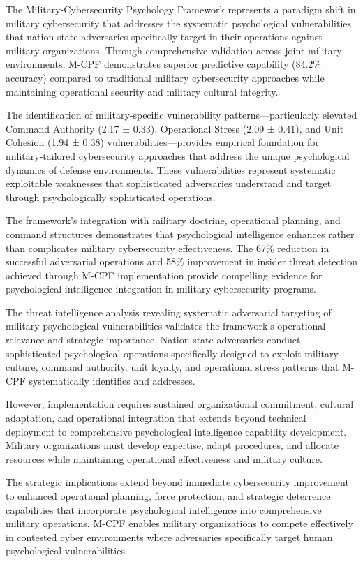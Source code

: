 \documentclass[10pt, twocolumn]{article}
\begin{document}
The Military-Cybersecurity Psychology Framework represents a paradigm shift in military cybersecurity that addresses the systematic psychological vulnerabilities that nation-state adversaries specifically target in their operations against military organizations. Through comprehensive validation across joint military environments, M-CPF demonstrates superior predictive capability (84.2\% accuracy) compared to traditional military cybersecurity approaches while maintaining operational security and military cultural integrity.

The identification of military-specific vulnerability patterns—particularly elevated Command Authority (2.17 ± 0.33), Operational Stress (2.09 ± 0.41), and Unit Cohesion (1.94 ± 0.38) vulnerabilities—provides empirical foundation for military-tailored cybersecurity approaches that address the unique psychological dynamics of defense environments. These vulnerabilities represent systematic exploitable weaknesses that sophisticated adversaries understand and target through psychologically sophisticated operations.

The framework's integration with military doctrine, operational planning, and command structures demonstrates that psychological intelligence enhances rather than complicates military cybersecurity effectiveness. The 67\% reduction in successful adversarial operations and 58\% improvement in insider threat detection achieved through M-CPF implementation provide compelling evidence for psychological intelligence integration in military cybersecurity programs.

The threat intelligence analysis revealing systematic adversarial targeting of military psychological vulnerabilities validates the framework's operational relevance and strategic importance. Nation-state adversaries conduct sophisticated psychological operations specifically designed to exploit military culture, command authority, unit loyalty, and operational stress patterns that M-CPF systematically identifies and addresses.

However, implementation requires sustained organizational commitment, cultural adaptation, and operational integration that extends beyond technical deployment to comprehensive psychological intelligence capability development. Military organizations must develop expertise, adapt procedures, and allocate resources while maintaining operational effectiveness and military culture.

The strategic implications extend beyond immediate cybersecurity improvement to enhanced operational planning, force protection, and strategic deterrence capabilities that incorporate psychological intelligence into comprehensive military operations. M-CPF enables military organizations to compete effectively in contested cyber environments where adversaries specifically target human psychological vulnerabilities.
\end{document}
